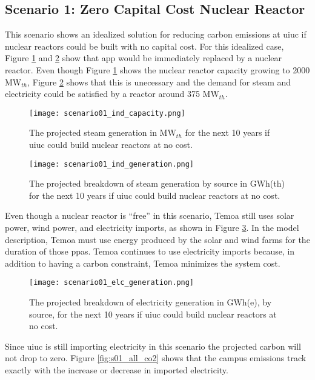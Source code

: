\subsection{Scenario 1: Zero Capital Cost Nuclear Reactor}

This scenario shows an idealized solution for reducing carbon
emissions at \gls{uiuc} if nuclear reactors could be built with no capital cost.
For this idealized case, Figure \ref{fig:s01_ind_cap} and \ref{fig:s01_ind_gen}
show that \gls{app} would be immediately replaced by a nuclear reactor. Even
though Figure \ref{fig:s01_ind_cap} shows the nuclear reactor capacity growing
to 2000 MW$_{th}$, Figure \ref{fig:s01_ind_gen} shows that this is
unecessary and the demand for steam and electricity could be satisfied by
a reactor around 375 MW$_{th}$.

\begin{figure}[ht!]
	\centering
	\texttt{[image: scenario01\_ind\_capacity.png]}
	\caption{The projected steam generation in MW$_{th}$ for the next 10 years
	if \gls{uiuc} could build nuclear reactors at no cost.}
	\label{fig:s01_ind_cap}
\end{figure}

\begin{figure}[ht!]
	\centering
	\texttt{[image: scenario01\_ind\_generation.png]}
	\caption{The projected breakdown of steam generation by source in GWh(th)
	for the next 10 years if \gls{uiuc} could build nuclear reactors at no cost.}
	\label{fig:s01_ind_gen}
\end{figure}

Even though a nuclear reactor is ``free'' in this scenario, Temoa still uses
solar power, wind power, and electricity imports, as shown in Figure
\ref{fig:s01_elc_gen}. In the model description,
Temoa must use energy produced by the solar and wind farms for the duration of
those \gls{ppa}s. Temoa continues to use electricity imports
because, in addition to having a carbon constraint, Temoa minimizes the system
cost.

\begin{figure}[ht!]
	\centering
	\texttt{[image: scenario01\_elc\_generation.png]}
	\caption{The projected breakdown of electricity generation in GWh(e), by
	source, for the next 10 years if \gls{uiuc} could build nuclear reactors at
	no cost.}
	\label{fig:s01_elc_gen}
\end{figure}

Since \gls{uiuc} is still importing electricity in this scenario the projected
carbon will not drop to zero. Figure \ref{fig:s01_all_co2} shows that the campus
emissions track exactly with the increase or decrease in imported electricity.


